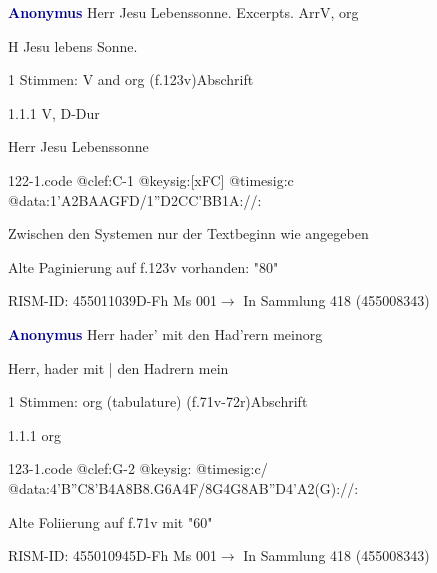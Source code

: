 \documentclass[twocolumn, 12pt]{book}
\begin{document}
\par \vspace{16pt} \textcolor{darkblue}{\textbf{Anonymus  }}\hfillplus{\textbf{[122]}}\newline Herr Jesu Lebenssonne. Excerpts. Arr\newline V, org
\par \begin{itshape} H Jesu lebens Sonne.\end{itshape} 
\par \textcolor{darkblue}{}  1 Stimmen: V and org  (f.123v)\newline Abschrift
\par 1.1.1  V, D-Dur\newline \begin{footnotesize} Herr Jesu Lebenssonne \end{footnotesize}  
\begin{filecontents*}{122-1.code}
@clef:C-1
@keysig:[xFC]
@timesig:c
@data:1'A2BAAGFD/1''D2CC'BB1A://:
\end{filecontents*}
\newline %
\par Zwischen den Systemen nur der Textbeginn wie angegeben
\par Alte Paginierung auf f.123v vorhanden: "80"
\par RISM-ID: 455011039\newline D-Fh  Ms 001\newline $\rightarrow$ In Sammlung 418 (455008343)
      
\par \vspace{16pt} \textcolor{darkblue}{\textbf{Anonymus  }}\hfillplus{\textbf{[123]}}\newline Herr hader' mit den Had'rern mein\newline org
\par \begin{itshape}[f.71v, at left:] Herr, hader mit | den Hadrern mein\end{itshape} 
\par \textcolor{darkblue}{}  1 Stimmen: org (tabulature)  (f.71v-72r)\newline Abschrift
\par 1.1.1  org  
\begin{filecontents*}{123-1.code}
@clef:G-2
@keysig:
@timesig:c/
@data:4'B''C8'B4A8B8.G6A4F/8G4G8A{B''D}4'A2(G)://:
\end{filecontents*}
\newline %
\par Alte Foliierung auf f.71v mit "60"
\par RISM-ID: 455010945\newline D-Fh  Ms 001\newline $\rightarrow$ In Sammlung 418 (455008343)
      
\end{document}
